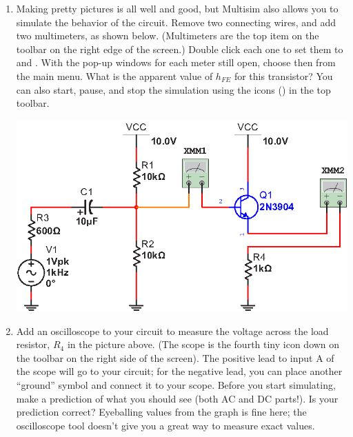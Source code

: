 \begin{enumerate}[wide]
\bigskip
\item Making pretty pictures is all well and good, but Multisim also allows you to simulate the behavior of the circuit.  Remove two connecting wires, and add two multimeters, as shown below.  (Multimeters are the top item on the toolbar on the right edge of the screen.)  Double click each one to set them to  and .  With the pop-up windows for each meter still open, choose  then  from the main menu.  What is the apparent value of $h_{FE}$ for this transistor?  You can also start, pause, and stop the simulation using the icons ()  in the top toolbar.
\begin{center}
\includegraphics{multisim/multimeters.eps}
\end{center}

\item Add an oscilloscope to your circuit to measure the voltage across the load resistor, $R_4$ in the picture above. (The scope is the fourth tiny icon down on the toolbar on the right side of the screen).  The positive lead to input A of the scope will go to your circuit; for the negative lead, you can place another ``ground'' symbol and connect it to your scope.  Before you start simulating, make a prediction of what you should see (both AC and DC parts!).  Is your prediction correct?  Eyeballing values from the graph is fine here; the oscilloscope tool doesn't give you a great way to measure exact values.


\end{enumerate}
